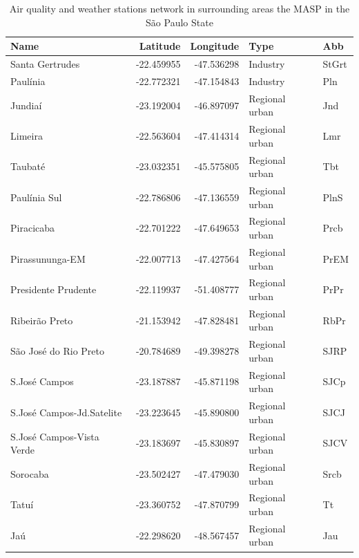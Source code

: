 \begin{table}
  	\centering
	\caption{Air quality and weather stations network in surrounding areas the MASP in the São Paulo State}
	\label{tab:sp_stations}
	\begin{tabular}{lrrll}
	\toprule
                       Name &   Latitude &  Longitude &                 Type &    Abb \\
	\midrule
            Santa Gertrudes & -22.459955 & -47.536298 &             Industry &  StGrt \\
                   Paulínia & -22.772321 & -47.154843 &             Industry &    Pln \\
                    Jundiaí & -23.192004 & -46.897097 &       Regional urban &    Jnd \\
                    Limeira & -22.563604 & -47.414314 &       Regional urban &    Lmr \\
                    Taubaté & -23.032351 & -45.575805 &       Regional urban &    Tbt \\
               Paulínia Sul & -22.786806 & -47.136559 &       Regional urban &   PlnS \\
                 Piracicaba & -22.701222 & -47.649653 &       Regional urban &   Prcb \\
            Pirassununga-EM & -22.007713 & -47.427564 &       Regional urban &   PrEM \\
        Presidente Prudente & -22.119937 & -51.408777 &       Regional urban &   PrPr \\
             Ribeirão Preto & -21.153942 & -47.828481 &       Regional urban &   RbPr \\
      São José do Rio Preto & -20.784689 & -49.398278 &       Regional urban &   SJRP \\
              S.José Campos & -23.187887 & -45.871198 &       Regional urban &   SJCp \\
  S.José Campos-Jd.Satelite & -23.223645 & -45.890800 &       Regional urban &   SJCJ \\
  S.José Campos-Vista Verde & -23.183697 & -45.830897 &       Regional urban &   SJCV \\
                   Sorocaba & -23.502427 & -47.479030 &       Regional urban &   Srcb \\
                      Tatuí & -23.360752 & -47.870799 &       Regional urban &     Tt \\
                        Jaú & -22.298620 & -48.567457 &       Regional urban &    Jau \\

\end{tabular}
\end{table}
